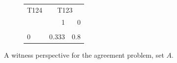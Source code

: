 \documentclass[
  10pt,
]{scrartcl}
\begin{document}
\begin{figure}[H]
\hspace{2cm}\hfill
\begin{subfigure}[!ht]{0.6\textwidth}
\centering\begingroup\fontsize{9}{11}\selectfont
\begin{tabular}{lrr}
\toprule
\multicolumn{1}{c}{T124} & \multicolumn{2}{c}{T123} \\
  & 1 & 0\\
\midrule
\cellcolor{gray!6}{1} & \cellcolor{gray!6}{0.667} & \cellcolor{gray!6}{0.2}\\
0 & 0.333 & 0.8\\
\bottomrule
\end{tabular}
\endgroup{}
\end{subfigure}
\caption{A witness perspective for the \textsf{agreement} problem, set $A$.}
\end{figure}
\end{document}
